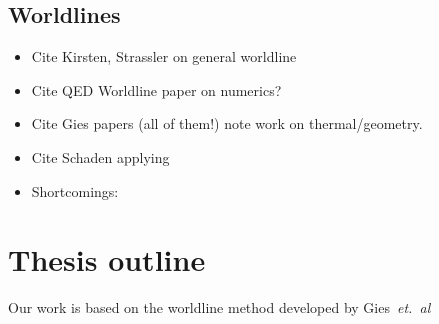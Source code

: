 \subsection{Worldlines}

\begin{itemize}
\item Cite Kirsten, Strassler on general worldline
\item Cite QED Worldline paper on numerics?
\item Cite Gies papers (all of them!) note work on thermal/geometry.
\item Cite Schaden applying
\item Shortcomings: 
\end{itemize}

\section{Thesis outline}


Our work is based on the worldline method developed by Gies~\textit{et.~al}\cite{Gies03}


